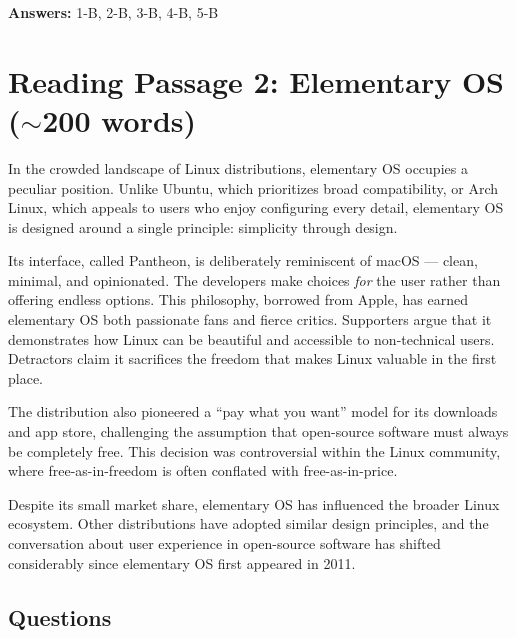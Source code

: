 \documentclass[10pt,a4paper]{article}
\begin{document}
\textbf{Answers:} 1-B, 2-B, 3-B, 4-B, 5-B

\section*{Reading Passage 2: Elementary OS ($\sim$200 words)}

\begin{tcolorbox}[colback=white, colframe=black]
\small
In the crowded landscape of Linux distributions, elementary OS
occupies a peculiar position. Unlike Ubuntu, which prioritizes
broad compatibility, or Arch Linux, which appeals to users who enjoy
configuring every detail, elementary OS is designed around a single
principle: simplicity through design.

Its interface, called Pantheon, is deliberately reminiscent of
macOS --- clean, minimal, and opinionated. The developers make
choices \emph{for} the user rather than offering endless options.
This philosophy, borrowed from Apple, has earned elementary OS both
passionate fans and fierce critics. Supporters argue that it
demonstrates how Linux can be beautiful and accessible to non-technical
users. Detractors claim it sacrifices the freedom that makes Linux
valuable in the first place.

The distribution also pioneered a ``pay what you want'' model for
its downloads and app store, challenging the assumption that open-source
software must always be completely free. This decision was
controversial within the Linux community, where free-as-in-freedom
is often conflated with free-as-in-price.

Despite its small market share, elementary OS has influenced the
broader Linux ecosystem. Other distributions have adopted similar
design principles, and the conversation about user experience in
open-source software has shifted considerably since elementary OS
first appeared in 2011.
\end{tcolorbox}

\subsection*{Questions}
\end{document}
